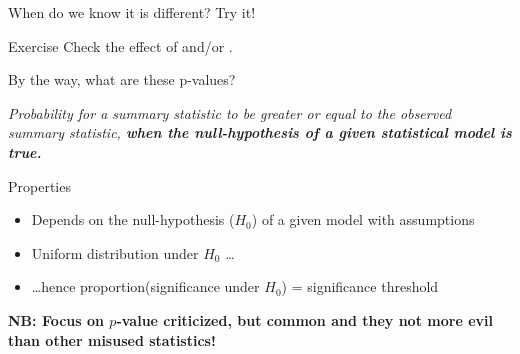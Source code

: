 \documentclass[10pt]{beamer}\usepackage[]{graphicx}\usepackage[]{color}
\begin{document}

\begin{frame}[fragile]{When do we know it is different? Try it!}

\begin{alertblock}{Exercise}
Check the effect of {\color{orange}{smaller variability}} and/or {\color{blue}{larger sample size}}.
\end{alertblock}
\end{frame}

\begin{frame}{By the way, what are these p-values?}%

\textit{Probability for a summary statistic to be greater or equal to the observed summary statistic, \textbf{when the null-hypothesis of a given statistical model is true.}}

\pause

\begin{exampleblock}{Properties}
  \begin{itemize}
    \item Depends on the null-hypothesis ($H_0$) of a given model with assumptions
    \item Uniform distribution under $H_0$ \dots
    \item \dots hence proportion(significance under $H_0$) = significance threshold
  \end{itemize}
\end{exampleblock}

\pause
\textbf{NB: Focus on $p$-value criticized, but common and they not more evil than other misused statistics!}
\end{frame}
\end{document}
